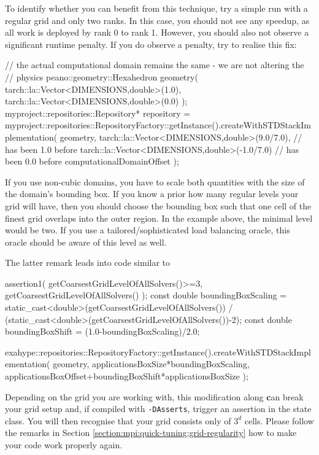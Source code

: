 To identify whether you can benefit from this technique, try a simple run with a
regular grid and only two ranks. 
In this case, you should not see any speedup, as all work is deployed by rank 0 to rank 1. 
However, you should also not observe a significant runtime penalty. 
If you do observe a penalty, try to realise this fix:


\begin{code}
// the actual computational domain remains the same - we are not altering the
// physics
peano::geometry::Hexahedron geometry(
  tarch::la::Vector<DIMENSIONS,double>(1.0),
  tarch::la::Vector<DIMENSIONS,double>(0.0) );
myproject::repositories::Repository* repository = 
  myproject::repositories::RepositoryFactory::getInstance().createWithSTDStackImplementation(
  geometry,
  tarch::la::Vector<DIMENSIONS,double>(9.0/7.0),   // has been 1.0 before
  tarch::la::Vector<DIMENSIONS,double>(-1.0/7.0)   // has been 0.0 before
  computationalDomainOffset );
\end{code}

\begin{remark}
If you use non-cubic domains, you have to scale both quantities with the size of
the domain's bounding box.
If you know a prior how many regular levels your grid will have, then you should
choose the bounding box such that one cell of the finest grid overlaps into the
outer region. 
In the example above, the minimal level would be two.
If you use a tailored/sophisticated load balancing oracle, this oracle should be
aware of this level as well.
\end{remark}

The latter remark leads into code similar to
\begin{code}
  assertion1( getCoarsestGridLevelOfAllSolvers()>=3, getCoarsestGridLevelOfAllSolvers() ); 
  const double boundingBoxScaling = 
    static_cast<double>(getCoarsestGridLevelOfAllSolvers()) /
    (static_cast<double>(getCoarsestGridLevelOfAllSolvers())-2); 
  const double boundingBoxShift   = (1.0-boundingBoxScaling)/2.0; 
  
  exahype::repositories::RepositoryFactory::getInstance().createWithSTDStackImplementation(
      geometry,
      applicationsBoxSize*boundingBoxScaling,
      applicationsBoxOffset+boundingBoxShift*applicationsBoxSize
      );
\end{code}


\begin{smell}
Depending on the grid you are working with, this modification along {\textbf can
break your grid setup and, if compiled with \texttt{-DAsserts}, trigger an
assertion in the state class.} 
You will then recognise that your grid consists only of $3^d$ cells.
Please follow the remarks in
Section \ref{section:mpi:quick-tuning:grid-regularity} how to make your code
work properly again.
\end{smell}



